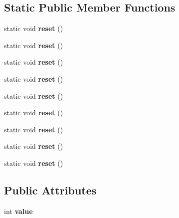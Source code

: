 \subsection*{Static Public Member Functions}
\begin{DoxyCompactItemize}
\item 
\mbox{\label{struct_counted_aa405a15d4d15b557101e0c0c0792d13c}} 
static void {\bfseries reset} ()
\item 
\mbox{\label{struct_counted_aa405a15d4d15b557101e0c0c0792d13c}} 
static void {\bfseries reset} ()
\item 
\mbox{\label{struct_counted_aa405a15d4d15b557101e0c0c0792d13c}} 
static void {\bfseries reset} ()
\item 
\mbox{\label{struct_counted_aa405a15d4d15b557101e0c0c0792d13c}} 
static void {\bfseries reset} ()
\item 
\mbox{\label{struct_counted_aa405a15d4d15b557101e0c0c0792d13c}} 
static void {\bfseries reset} ()
\item 
\mbox{\label{struct_counted_aa405a15d4d15b557101e0c0c0792d13c}} 
static void {\bfseries reset} ()
\item 
\mbox{\label{struct_counted_aa405a15d4d15b557101e0c0c0792d13c}} 
static void {\bfseries reset} ()
\item 
\mbox{\label{struct_counted_aa405a15d4d15b557101e0c0c0792d13c}} 
static void {\bfseries reset} ()
\item 
\mbox{\label{struct_counted_aa405a15d4d15b557101e0c0c0792d13c}} 
static void {\bfseries reset} ()
\end{DoxyCompactItemize}
\subsection*{Public Attributes}
\begin{DoxyCompactItemize}
\item 
\mbox{\label{struct_counted_a3e049fc52a91f5c003cd5c24807ffce5}} 
int {\bfseries value}
\end{DoxyCompactItemize}

